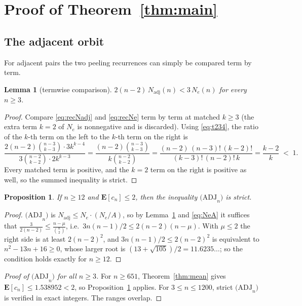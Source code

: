 \documentclass[11pt,a4paper]{amsart}
\theoremstyle{plain}
\newtheorem{proposition}[theorem]{Proposition}
\newtheorem{lemma}[theorem]{Lemma}
\theoremstyle{definition}
\newcommand{\EX}{\mathbf{E}}
\newcommand{\Nc}{N}
\newcommand{\ADJ}{\mathrm{(ADJ}_n\mathrm{)}}
\begin{document}
\section{Proof of Theorem~\ref{thm:main}}\label{sec:assembly}

\subsection{The adjacent orbit}

For adjacent pairs the two peeling recurrences can simply be compared term by
term.

\begin{lemma}[termwise comparison]\label{lem:adjterm}
$2(n-2)\,\Nc_{\mathrm{adj}}(n) < 3\,\Nc_e(n)$ for every $n \ge 3$.
\end{lemma}

\begin{proof}
Compare \eqref{eq:recNadj} and \eqref{eq:recNe} term by term at matched $k \ge 3$
(the extra term $k=2$ of $\Nc_e$ is nonnegative and is discarded). Using
\eqref{eq:t234}, the ratio of the $k$-th term on the left to the $k$-th term on
the right is
\[
  \frac{2(n-2)\binom{n-3}{k-3}\cdot 3k^{k-4}}{3\binom{n-2}{k-2}\cdot 2k^{k-3}}
  = \frac{(n-2)\binom{n-3}{k-3}}{k\binom{n-2}{k-2}}
  = \frac{(n-2)\,(n-3)!\,(k-2)!}{(k-3)!\,(n-2)!\,k}
  = \frac{k-2}{k}\;<\;1 .
\]
Every matched term is positive, and the $k=2$ term on the right is positive as
well, so the summed inequality is strict.
\end{proof}

\begin{proposition}\label{prop:adj}
If $n \ge 12$ and $\EX[c_n]\le 2$, then the inequality $\ADJ$ is strict.
\end{proposition}

\begin{proof}
$\ADJ$ is $\Nc_{\mathrm{adj}} \le \Nc_e\cdot(\Nc_e/A)$, so by
Lemma~\ref{lem:adjterm} and \eqref{eq:NeA} it suffices that
$\frac{3}{2(n-2)} \le \frac{n-\mu}{\binom{n}{2}}$, i.e.\
$3n(n-1)/2 \le 2(n-2)(n-\mu)$. With $\mu \le 2$ the right side is at least
$2(n-2)^2$, and $3n(n-1)/2\le 2(n-2)^2$ is equivalent to $n^2-13n+16\ge0$, whose
larger root is $(13+\sqrt{105})/2 = 11.6235\ldots$; so the condition holds
exactly for $n \ge 12$.
\end{proof}

\begin{proof}[Proof of $\ADJ$ for all $n \ge 3$]
For $n \ge 651$, Theorem~\ref{thm:mean} gives $\EX[c_n]\le 1.538952 < 2$, so
Proposition~\ref{prop:adj} applies. For $3 \le n \le 1200$, strict $\ADJ$ is
verified in exact integers. The ranges overlap.
\end{proof}
\end{document}

